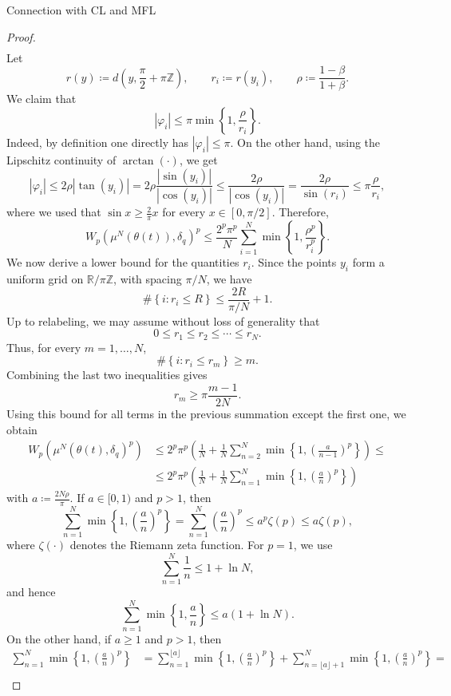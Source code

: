 \documentclass{article}
\theoremstyle{definition}
\newcommand{\R}{\mathbb{R}}
\newcommand{\Z}{\mathbb{Z}}
\begin{document}
\begin{section}{Connection with CL and MFL}
\begin{proof}
\begin{align*}
       \end{align*}
       Let
       $$r(y)\coloneqq d\left(y,\frac{\pi}{2}+\pi\Z\right),\qquad r_i\coloneqq r(y_i),\qquad \rho\coloneqq\frac{1-\beta}{1+\beta}.$$
       We claim that
       $$|\varphi_i|\leq\pi\min\left\{1,\frac{\rho}{r_i}\right\}.$$
       Indeed, by definition one directly has $|\varphi_i|\leq\pi$. On the other hand, using the Lipschitz continuity of $\arctan(\cdot)$, we get
       $$ |\varphi_i| \leq 2\rho|\tan(y_i)| = 2\rho\frac{|\sin(y_i)|}{|\cos(y_i)|} \leq \frac{2\rho}{|\cos(y_i)|} = \frac{2\rho}{\sin(r_i)} \leq \pi\frac{\rho}{r_i}, $$
       where we used that $\sin x\geq\frac{2}{\pi}x$ for every $x\in[0,\pi/2]$. Therefore,
       $$W_p\left(\mu^N(\theta(t)),\delta_q\right)^p \leq \frac{2^p\pi^p}{N} \sum_{i=1}^N \min\left\{1,\frac{\rho^p}{r_i^p}\right\}.$$
       We now derive a lower bound for the quantities $r_i$. Since the points $y_i$ form a uniform grid on $\R/\pi\Z$, with spacing $\pi/N$, we have
       $$ \#\left\{i:r_i\leq R\right\} \leq \frac{2R}{\pi/N}+1. $$
       Up to relabeling, we may assume without loss of generality that
       $$0\leq r_1\leq r_2\leq\cdots\leq r_N.$$
       Thus, for every $m=1,\ldots,N$,
       $$ \#\left\{i:r_i\leq r_m\right\}\geq m. $$
       Combining the last two inequalities gives
       $$r_m\geq\pi\frac{m-1}{2N}.$$
       Using this bound for all terms in the previous summation except the first one, we obtain
       \begin{align*}
        W_p\left(\mu^N(\theta(t),\delta_{q})^p\right)&\leq2^p\pi^p\left(\frac{1}{N}+\frac{1}{N}\sum_{n=2}^N\min\left\{1,\left(\frac{a}{n-1}\right)^p\right\}\right)\leq\\
        &\leq2^p\pi^p\left(\frac{1}{N}+\frac{1}{N}\sum_{n=1}^N\min\left\{1,\left(\frac{a}{n}\right)^p\right\}\right)
       \end{align*}
       with $a\coloneqq\frac{2N\rho}{\pi}$. If $a\in[0,1)$ and $p>1$, then
       $$ \sum_{n=1}^N \min\left\{1,\left(\frac{a}{n}\right)^p\right\} = \sum_{n=1}^N\left(\frac{a}{n}\right)^p \leq a^p\zeta(p) \leq a\zeta(p), $$
       where $\zeta(\cdot)$ denotes the Riemann zeta function. For $p=1$, we use
       $$\sum_{n=1}^N\frac{1}{n}\leq1+\ln N,$$
       and hence
       $$ \sum_{n=1}^N \min\left\{1,\frac{a}{n}\right\} \leq a(1+\ln N). $$
       On the other hand, if $a\geq1$ and $p>1$, then 
       \begin{align*}
            \sum_{n=1}^N\min\left\{1,\left(\frac{a}{n}\right)^p\right\}&=\sum_{n=1}^{\lfloor a\rfloor}\min\left\{1,\left(\frac{a}{n}\right)^p\right\}+\sum_{n=\lfloor a\rfloor+1}^N\min\left\{1,\left(\frac{a}{n}\right)^p\right\}=\\

\end{align*}
\end{proof}
\end{section}
\end{document}
